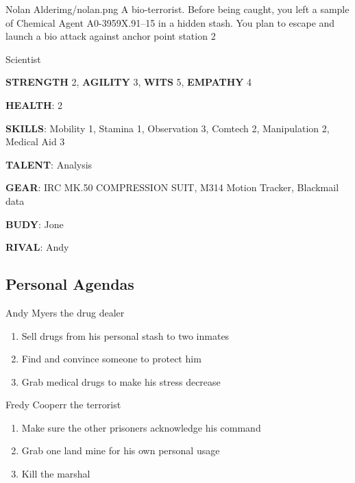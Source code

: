 \newsect

\begin{rpg-pcbox}{Nolan Alder}{img/nolan.png}
    A bio-terrorist. Before being caught, you left a sample of Chemical Agent A0-3959X.91–15 in a hidden stash. You plan to escape and launch a bio attack against anchor point station 2
\end{rpg-pcbox}

\begin{rpg-commentbox}{}
    Scientist

    \textbf{STRENGTH} 2, \textbf{AGILITY} 3, \textbf{WITS} 5, \textbf{EMPATHY} 4

    \textbf{HEALTH}: 2

    \textbf{SKILLS}: Mobility 1, Stamina 1, Observation 3, Comtech 2, Manipulation 2, Medical Aid 3
    
    \textbf{TALENT}: Analysis
    
    \textbf{GEAR}: IRC MK.50 COMPRESSION SUIT, M314 Motion Tracker, Blackmail data

    \textbf{BUDY}: Jone
    
    \textbf{RIVAL}: Andy
\end{rpg-commentbox}


\clearpage

\subsection{Personal Agendas}


 
\begin{rpg-commentbox}{Andy Myers the drug dealer}
    \begin{enumerate}[label=\textbf{Act \arabic*}, leftmargin=1cm]
        \item Sell drugs from his personal stash to two inmates
        \item Find and convince someone to protect him
        \item Grab medical drugs to make his stress decrease
    \end{enumerate}
\end{rpg-commentbox}

\begin{rpg-commentbox}{Fredy Cooperr the terrorist}
    \begin{enumerate}[label=\textbf{Act \arabic*}, leftmargin=1cm]
        \item Make sure the other prisoners acknowledge his command
        \item Grab one land mine for his own personal usage
        \item Kill the marshal
    \end{enumerate}
\end{rpg-commentbox}


